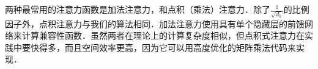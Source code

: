 
两种最常用的注意力函数是加法注意力\citep{bahdanau2014neural}，和点积（乘法）注意力．除了$\frac{1}{\sqrt{d_k}}$的比例因子外，点积注意力与我们的算法相同．加法注意力使用具有单个隐藏层的前馈网络来计算兼容性函数．虽然两者在理论上的计算复杂度相似，但点积式注意力在实践中要快得多，而且空间效率更高，因为它可以用高度优化的矩阵乘法代码来实现．





